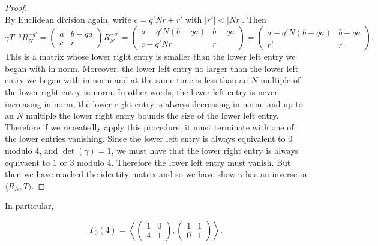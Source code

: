 \documentclass[12pt]{book}
\theoremstyle{definition}\newframedtheorem{method}{Method}
\newcommand{\g}{\gamma}
\newcommand{\G}{\Gamma}
\newcommand{\<}{\langle}
\renewcommand{\>}{\rangle}
\begin{document}
\begin{proof}
\[      \]
      By Euclidean division again, write $c = q'Nr+r'$ with $|r'| < |Nr|$. Then
      \[
        \g T^{-q}R_{N}^{-q'} = \begin{pmatrix} a & b-qa \\ c & r \end{pmatrix}R_{N}^{-q'} = \begin{pmatrix} a-q'N(b-qa) & b-qa \\ c-q'Nr & r \end{pmatrix} =  \begin{pmatrix} a-q'N(b-qa) & b-qa \\ r' & r \end{pmatrix}.
      \]
      This is a matrix whose lower right entry is smaller than the lower left entry we began with in norm. Moreover, the lower left entry no larger than the lower left entry we began with in norm and at the same time is less than an $N$ multiple of the lower right entry in norm. In other words, the lower left entry is never increasing in norm, the lower right entry is always decreasing in norm, and up to an $N$ multiple the lower right entry bounds the size of the lower left entry. Therefore if we repeatedly apply this procedure, it must terminate with one of the lower entries vanishing. Since the lower left entry is always equivalent to $0$ modulo $4$, and $\det(\g) = 1$, we must have that the lower right entry is always equivaent to $1$ or $3$ modulo $4$. Therefore the lower left entry must vanish. But then we have reached the identity matrix and so we have show $\g$ has an inverse in $\<R_{N},T\>$.
    \end{proof}

    In particular,

    \[
      \G_{0}(4) = \left\<\begin{pmatrix} 1 & 0 \\ 4 & 1 \end{pmatrix},\begin{pmatrix} 1 & 1 \\ 0 & 1 \end{pmatrix}\right\>.
    \]
\end{document}

